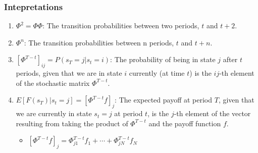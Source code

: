 \documentclass{article}
\begin{document}
\subsubsection{Intepretations}
\begin{enumerate}
    \item $ \Phi^2 = \Phi \Phi $: The transition probabilities between two 
    periods, $ t $ and $ t + 2 $.
    \item $ \Phi^n $: The transition probabilities between n periods, $ t $ and
    $ t + n $.
    \item $ {[\Phi^{T-t}]}_{ij} = P(s_T = j | s_t = i) $: The probability of 
    being in state $ j $ after $ t $ periods, given that we are in state $ i $
    currently (at time $ t $) is the $ ij $-th element of the stochastic matrix
    $ \Phi^{T-t} $.
    \item $ E[F(s_T) | s_t = j] = {[\Phi^{T-t}f]}_j $: The expected payoff at 
    period $ T $, given that we are currently in state $ s_t = j $ at period 
    $ t $, is the $ j $-th element of the vector resulting from taking the 
    product of $ \Phi^{T-t} $ and the payoff function $ f $. 
    \begin{itemize}
        \item $ {[\Phi^{T-t}f]}_j = \Phi_{j1}^{T-t} f_1 + \cdots + \Phi_{jN}^{T-t} f_N $
    \end{itemize}
\end{enumerate}
\end{document}
